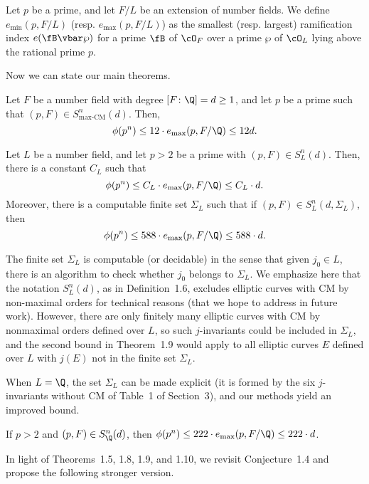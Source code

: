\begin{dfn}
Let $p$ be a prime, and let $F/L$ be an extension of number fields. We define $e_{\min}(p, F/L)$ (resp. $e_{\max}(p, F/L)$) as the smallest (resp. largest) ramification index $e(\fB \vbar \wp)$ for a prime $\fB$ of $\cO_F$ over a prime $\wp$ of $\cO_L$ lying above the rational prime $p$. 
\end{dfn}


Now we can state our main theorems.


\begin{thm} %
Let $F$ be a number field with degree $[F \colon \Q]= d \geq 1$, and let $p$ be a prime such that $(p, F) \in S^n_{\text{max-CM}}(d)$. Then,
	\[
	\phi(p^n) \leq 12 \cdot e_{\max}(p, F/\Q) \leq 12d. 
	\]
\end{thm}


\begin{thm} %
Let $L$ be a number field, and let $p > 2$ be a prime with $(p, F) \in S^n_L(d)$. Then, there is a constant $C_L$ such that 
	\[
	\phi(p^n) \leq C_L \cdot e_{\max}(p, F/\Q) \leq C_L \cdot d.
	\]
Moreover, there is a computable finite set $\Sigma_L$ such that if $(p, F) \in S^n_L(d, \Sigma_L)$, then
	\[
	\phi(p^n) \leq 588 \cdot e_{\max}(p, F/\Q) \leq 588 \cdot d.
	\]
\end{thm}


The finite set $\Sigma_L$ is computable (or decidable) in the sense that given $j_0 \in L$, there is an algorithm to check whether $j_0$ belongs to $\Sigma_L$. We emphasize here that the notation $S^n_L(d)$, as in Definition~1.6, excludes elliptic curves with CM by non-maximal orders for technical reasons (that we hope to address in future work). However, there are only finitely many elliptic curves with CM by nonmaximal orders defined over $L$, so such $j$-invariants could be included in $\Sigma_L$, and the second bound in Theorem~1.9 would apply to all elliptic curves $E$ defined over $L$ with $j(E)$ not in the finite set $\Sigma_L$.


When $L= \Q$, the set $\Sigma_L$ can be made explicit (it is formed by the six $j$-invariants without CM of Table~1 of Section~3), and our methods yield an improved bound.


\begin{thm} %
If $p > 2$ and $(p, F) \in S^n_\Q(d)$, then $\phi(p^n) \leq 222 \cdot e_{\max}(p, F/\Q) \leq 222 \cdot d$. 
\end{thm}


In light of Theorems~1.5, 1.8, 1.9, and 1.10, we revisit Conjecture~1.4 and propose the following stronger version.


